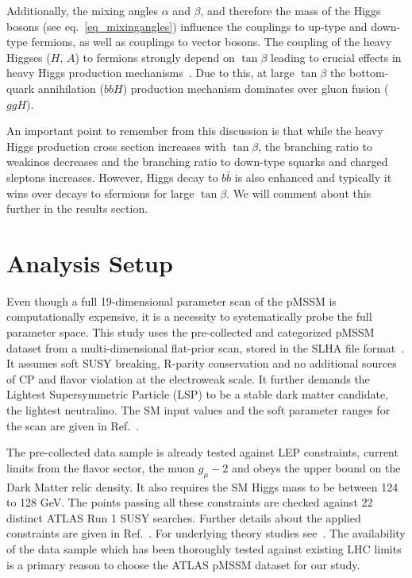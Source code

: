 \documentclass[11pt,a4paper]{article}
\begin{document}
Additionally, the mixing angles $\alpha$ and $\beta$, and therefore the mass of the Higgs bosons (see eq.~\ref{eq_mixingangles}) influence the couplings to up-type and down-type fermions, as well as couplings to vector bosons. The coupling of the heavy Higgses ($H$, $A$) to fermions strongly depend on $\tan\beta$ leading to crucial effects in heavy Higgs production mechanisms~\cite{Gunion:1989we, Djouadi:2005gj, Drees:873465}. Due to this, at large $\tan\beta$ the bottom-quark annihilation ($bbH$) production mechanism dominates over gluon fusion ($ggH$). 

An important point to remember from this discussion is that while the heavy Higgs production cross section increases with $\tan\beta$, the branching ratio to weakinos decreases and the branching ratio to down-type squarks and charged sleptons increases. However, Higgs decay to $b\bar{b}$ is also enhanced and typically it wins over decays to sfermions for large $\tan\beta$. We will comment about this further in the results section. 

\section{Analysis Setup}
\label{sec:anlysis}
Even though a full 19-dimensional parameter scan of the pMSSM is computationally expensive, it is a necessity to systematically probe the full parameter space. This study uses the pre-collected and categorized pMSSM dataset from a multi-dimensional flat-prior scan, stored in the SLHA file format~\cite{Aad:2015baa}. It assumes soft SUSY breaking, R-parity conservation and no additional sources of CP and flavor violation at the electroweak scale. It further demands the Lightest Supersymmetric Particle (LSP) to be a stable dark matter candidate, the lightest neutralino. The SM input values and the soft parameter ranges for the scan are given in Ref.~\cite{Berger:2008cq}.

The pre-collected data sample is already tested against LEP constraints, current limits from the flavor sector, the muon $g_\mu-2$ and obeys the upper bound on the Dark Matter relic density. It also requires the SM Higgs mass to be between 124 to 128 GeV. The points passing all these constraints are checked against 22 distinct ATLAS Run 1 SUSY searches. Further details about the applied constraints are given in Ref.~\cite{Aad:2015baa}. For underlying theory studies see~\cite{Berger:2008cq, CahillRowley:2012cb, CahillRowley:2012kx, Cahill-Rowley:2014twa}. The availability of the data sample which has been thoroughly tested against existing LHC limits is a primary reason to choose the ATLAS pMSSM dataset for our study.
\end{document}
